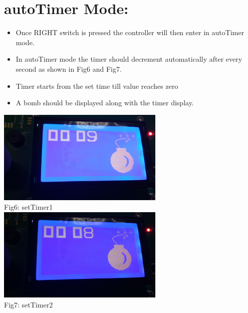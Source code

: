 \documentclass{article}
\begin{document}
\section{autoTimer Mode:}
\begin{itemize}
    \item Once RIGHT switch is pressed the controller will then enter in autoTimer mode.
    \item In autoTimer mode the timer should decrement automatically after every second as shown in Fig6 and Fig7. 
    \item Timer starts from the set time till value reaches zero
    \item A bomb should be displayed along with the timer display.
\end{itemize}
\begin{center}
   \includegraphics[width=8cm]{autoTimer1}
   \\Fig6: setTimer1
   \\[2\baselineskip]
   \includegraphics[width=8cm]{autoTimer2}
   \\Fig7: setTimer2
   \\[2\baselineskip]
 \end{center}
\end{document}
